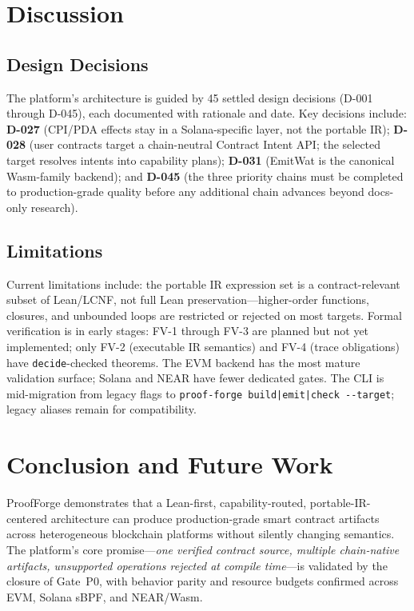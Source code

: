 \documentclass[sigconf]{acmart}
\begin{document}
\section{Discussion}
\label{sec:disc}

\subsection{Design Decisions}

The platform's architecture is guided by 45 settled design decisions (D-001 through D-045), each
documented with rationale and date. Key decisions include: \textbf{D-027} (CPI/PDA effects stay
in a Solana-specific layer, not the portable IR); \textbf{D-028} (user contracts target a
chain-neutral Contract Intent API; the selected target resolves intents into capability plans);
\textbf{D-031} (EmitWat is the canonical Wasm-family backend); and \textbf{D-045} (the three
priority chains must be completed to production-grade quality before any additional chain
advances beyond docs-only research).

\subsection{Limitations}

Current limitations include: the portable IR expression set is a contract-relevant subset of
Lean/LCNF, not full Lean preservation---higher-order functions, closures, and unbounded loops
are restricted or rejected on most targets. Formal verification is in early stages: FV-1 through
FV-3 are planned but not yet implemented; only FV-2 (executable IR semantics) and FV-4 (trace
obligations) have \texttt{decide}-checked theorems. The EVM backend has the most mature validation
surface; Solana and NEAR have fewer dedicated gates. The CLI is mid-migration from legacy flags
to \texttt{proof-forge build|emit|check -{}-target}; legacy aliases remain for compatibility.

\section{Conclusion and Future Work}
\label{sec:concl}

ProofForge demonstrates that a Lean-first, capability-routed, portable-IR-centered architecture
can produce production-grade smart contract artifacts across heterogeneous blockchain platforms
without silently changing semantics. The platform's core promise---\emph{one verified contract
source, multiple chain-native artifacts, unsupported operations rejected at compile time}---is
validated by the closure of Gate~P0, with behavior parity and resource budgets confirmed across
EVM, Solana sBPF, and NEAR/Wasm.
\end{document}
